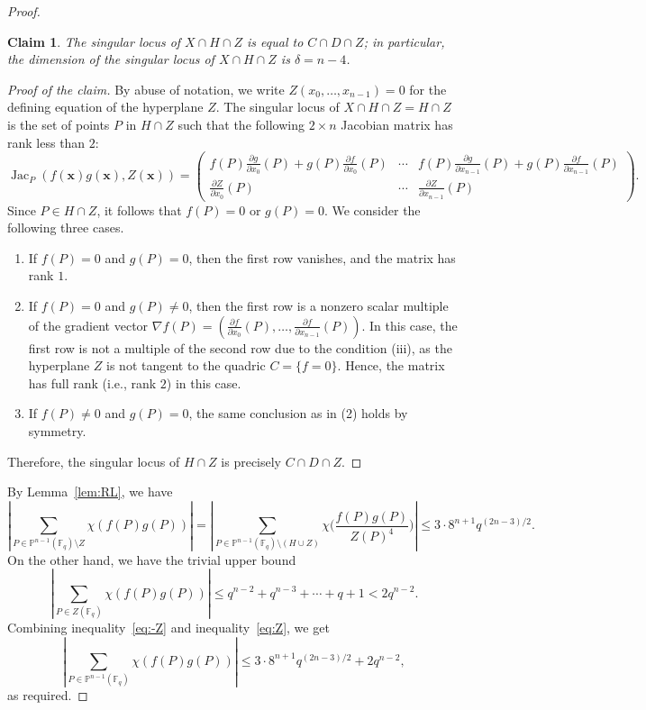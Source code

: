 \documentclass[12pt,reqno]{amsart}
\newtheorem{claim}[thm]{Claim}
\theoremstyle{definition}
\newcommand{\F}{\mathbb{F}}
\newenvironment{poc}{\begin{proof}[Proof of the claim]\renewcommand*{\qedsymbol}{$\blacksquare$}}{\end{proof}}
\begin{document}
\begin{proof}
\begin{claim}
The singular locus of $X\cap H\cap Z$ is equal to $C\cap D\cap Z$; in particular, the dimension of the singular locus of $X\cap H\cap Z$ is $\delta = n-4$.
\end{claim}
\begin{poc}
By abuse of notation, we write $Z(x_0, \ldots, x_{n-1})=0$ for the defining equation of the hyperplane $Z$. The singular locus of $X\cap H\cap Z = H\cap Z$ is the set of points $P$ in $H\cap Z$ such that the following $2\times n$ Jacobian matrix has rank less than $2$:
$$
\operatorname{Jac}_{P}(f(\mathbf{x})g(\mathbf{x}), Z(\mathbf{x})) = 
\begin{pmatrix}
 f(P) \frac{\partial g}{\partial x_0}(P) + g(P) \frac{\partial f}{\partial x_0}(P) &  \cdots &  f(P) \frac{\partial g}{\partial x_{n-1}}(P) + g(P) \frac{\partial f}{\partial x_{n-1}}(P) \\ 
 \frac{\partial Z}{\partial x_0}(P) & \cdots & \frac{\partial Z}{\partial x_{n-1}}(P)
\end{pmatrix}.
$$
Since $P\in H\cap Z$, it follows that $f(P)=0$ or $g(P)=0$. We consider the following three cases. 
\begin{enumerate}
    \item If $f(P)=0$ and $g(P)=0$, then the first row vanishes, and the matrix has rank $1$. 
\item If $f(P)=0$ and $g(P)\neq 0$, then the first row is a nonzero scalar multiple of the gradient vector $\nabla f (P)=\left(\frac{\partial f}{\partial x_0}(P), \ldots, \frac{\partial f}{\partial x_{n-1}}(P) \right)$. In this case, the first row is not a multiple of the second row due to the condition (iii), as the hyperplane $Z$ is not tangent to the quadric $C=\{f=0\}$. Hence, the matrix has full rank (i.e., rank $2$) in this case.
\item If $f(P)\neq 0$ and $g(P)=0$, the same conclusion as in (2) holds by symmetry. 
\end{enumerate}
Therefore, the singular locus of $H\cap Z$ is precisely $C\cap D\cap Z$.
\end{poc}

By Lemma~\ref{lem:RL}, we have
\begin{equation}\label{eq:-Z}
\left|\sum_{P\in\mathbb{P}^{n-1}(\F_q)\setminus Z} \chi(f(P) g(P))\right|=\left|\sum_{P\in\mathbb{P}^{n-1}(\F_q)\setminus (H \cup Z)} \chi\bigg(\frac{f(P) g(P)}{Z(P)^4}\bigg)\right| \leq 3\cdot 8^{n+1} q^{(2n-3)/2}.  
\end{equation}
On the other hand, we have the trivial upper bound 
\begin{equation}\label{eq:Z}
\left|\sum_{P\in Z(\F_q)} \chi(f(P) g(P))\right| \leq q^{n-2}+q^{n-3} + \cdots + q + 1 < 2 q^{n-2}.
\end{equation}
Combining inequality~\eqref{eq:-Z} and inequality~\eqref{eq:Z}, we get
$$
\left|\sum_{P\in\mathbb{P}^{n-1}(\F_q)} \chi(f(P) g(P))\right| \leq 3\cdot 8^{n+1} q^{(2n-3)/2} +2q^{n-2}, 
$$
as required.
\end{proof}
\end{document}
